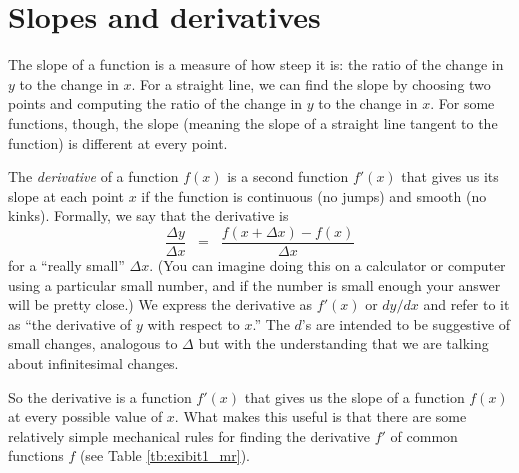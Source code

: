 \section{Slopes and derivatives}

The slope of a function is a measure of how steep it is: the ratio
of the change in $y$ to the change in $x$. For a straight line, we
can find the slope by choosing two points and computing the ratio
of the change in $y$ to the change in $x$. For some functions,
though, the slope (meaning the slope of a straight line tangent to
the function) is different at every point.


The {\it derivative\/} of a function $f(x)$
is a second function  $f'(x)$ that gives us its slope at each point $x$
if the function is continuous (no jumps) and smooth (no kinks).
Formally, we say that the derivative is
\[
  \frac{\Delta y}{\Delta x} \;\;=\;\; \frac{f(x+\Delta x) - f(x)}{\Delta x}
\]
for  a ``really small'' $\Delta x$. (You can imagine doing this on
a calculator or computer using a particular small number, and if
the number is small enough your answer will be pretty close.) We
express the derivative as $f'(x)$ or $dy/dx$ and refer to it as
``the derivative of $y$ with respect to $x$.'' The $d$'s are
intended to be suggestive of small changes, analogous to $\Delta$
but with the understanding that we are talking about infinitesimal
changes.


So the derivative is a function $f'(x)$ that gives us the slope of a function $f(x)$ at every possible value of $x$.
What makes this useful is that there are some
relatively simple mechanical rules for finding the derivative $f'$
of common functions $f$ (see Table \ref{tb:exibit1_mr}).

